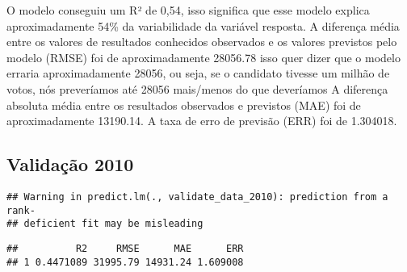\documentclass[]{article}
\newenvironment{Shaded}{\begin{snugshade}}{\end{snugshade}}
\newcommand{\KeywordTok}[1]{\textcolor[rgb]{0.13,0.29,0.53}{\textbf{#1}}}
\newcommand{\DataTypeTok}[1]{\textcolor[rgb]{0.13,0.29,0.53}{#1}}
\newcommand{\DecValTok}[1]{\textcolor[rgb]{0.00,0.00,0.81}{#1}}
\newcommand{\StringTok}[1]{\textcolor[rgb]{0.31,0.60,0.02}{#1}}
\newcommand{\OperatorTok}[1]{\textcolor[rgb]{0.81,0.36,0.00}{\textbf{#1}}}
\newcommand{\NormalTok}[1]{#1}
\begin{document}
O modelo conseguiu um R² de 0,54, isso significa que esse modelo explica
aproximadamente 54\% da variabilidade da variável resposta. A diferença
média entre os valores de resultados conhecidos observados e os valores
previstos pelo modelo (RMSE) foi de aproximadamente 28056.78 isso quer
dizer que o modelo erraria aproximadamente 28056, ou seja, se o
candidato tivesse um milhão de votos, nós preveríamos até 28056
mais/menos do que deveríamos A diferença absoluta média entre os
resultados observados e previstos (MAE) foi de aproximadamente 13190.14.
A taxa de erro de previsão (ERR) foi de 1.304018.

\subsection{Validação 2010}\label{validacao-2010}

\begin{Shaded}
\end{Shaded}

\begin{verbatim}
## Warning in predict.lm(., validate_data_2010): prediction from a rank-
## deficient fit may be misleading
\end{verbatim}

\begin{Shaded}
\end{Shaded}

\begin{verbatim}
##          R2     RMSE      MAE      ERR
## 1 0.4471089 31995.79 14931.24 1.609008
\end{verbatim}
\end{document}
